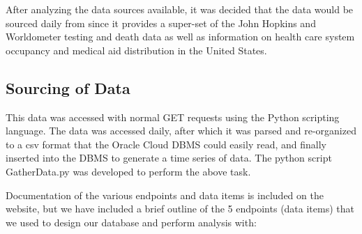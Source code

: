 \documentclass[11pt]{article}
\newcommand{\MYhref}[3][blue]{\href{#2}{\color{#1}{#3}}}%
\begin{document}
\noindent
After analyzing the data sources available, it was decided that the data would be sourced daily from \MYhref{https://www.npmjs.com/package/covid19-api}{Covid-19 API} since it provides a super-set of the John Hopkins and Worldometer testing and death data as well as information on health care system occupancy and medical aid distribution in the United States. 

\subsection{Sourcing of Data}
\label{subsec:sourcedata}


\noindent
This data was accessed with normal GET requests using the Python scripting language. The data was accessed daily, after which it was parsed and re-organized to a csv format that the Oracle Cloud DBMS could easily read, and finally inserted into the DBMS to generate a time series of data. The python script GatherData.py was developed to perform the above task.


\noindent 
Documentation of the various endpoints and data items is included on the \MYhref{https://covid19-docs.chrismichael.now.sh/}{Covid-19 API} website, but we have included a brief outline of the 5 endpoints (data items) that we used to design our database and perform analysis with:
\end{document}
